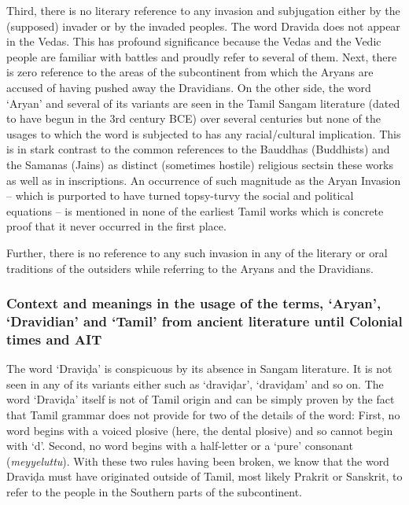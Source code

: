 Third, there is no literary reference to any invasion and subjugation either by the (supposed) invader or by the invaded peoples. The word Dravida does not appear in the Vedas. This has profound significance because the Vedas and the Vedic people are familiar with battles and proudly refer to several of them. Next, there is zero reference to the areas of the subcontinent from which the Aryans are accused of having pushed away the Dravidians. On the other side, the word ‘Aryan’ and several of its variants are seen in the Tamil Sangam literature (dated to have begun in the 3rd century BCE) over several centuries but none of the usages to which the word is subjected to has any racial/cultural implication. This is in stark contrast to the common references to the Bauddhas (Buddhists) and the Samanas (Jains) as distinct (sometimes hostile) religious sectsin these works as well as in inscriptions. An occurrence of such magnitude as the Aryan Invasion – which is purported to have turned topsy-turvy the social and political equations – is mentioned in none of the earliest Tamil works which is concrete proof that it never occurred in the first place.

Further, there is no reference to any such invasion in any of the literary or oral traditions of the outsiders while referring to the Aryans and the Dravidians.


\subsubsection{Context and meanings in the usage of the terms, ‘Aryan’, ‘Dravidian’ and ‘Tamil’ from ancient literature until Colonial times and AIT}

The word ‘Draviḍa’ is conspicuous by its absence in Sangam literature. It is not seen in any of its variants either such as ‘draviḍar’, ‘draviḍam’ and so on. The word ‘Draviḍa’ itself is not of Tamil origin and can be simply proven by the fact that Tamil grammar does not provide for two of the details of the word: First, no word begins with a voiced plosive (here, the dental plosive) and so cannot begin with ‘d’. Second, no word begins with a half-letter or a ‘pure’ consonant (\textit{meyyeluttu}). With these two rules having been broken, we know that the word Draviḍa must have originated outside of Tamil, most likely Prakrit or Sanskrit, to refer to the people in the Southern parts of the subcontinent.

